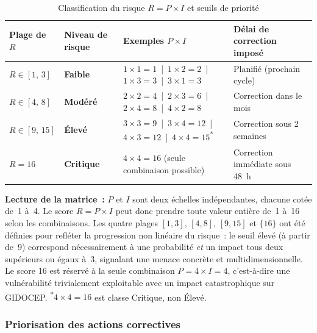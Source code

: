 \documentclass[12pt,a4paper,oneside]{report}
\begin{document}
\begin{table}[H]
	\centering\small
	\caption{Classification du risque $R = P \times I$ et seuils de priorit\'e}
	\label{tab:risque_classification}
	\begin{tabularx}{\textwidth}{p{2.5cm}p{3cm}p{4.5cm}X}
		\toprule
		\rowcolor{theadcolor}
		\color{white}\textbf{Plage de $R$} &
		\color{white}\textbf{Niveau de risque} &
		\color{white}\textbf{Exemples $P \times I$} &
		\color{white}\textbf{D\'elai de correction impos\'e} \\
		\midrule
		$R \in [1,\,3]$ & \textbf{Faible} &
		$1{\times}1{=}1$~|~$1{\times}2{=}2$~|~$1{\times}3{=}3$~|~$3{\times}1{=}3$ &
		Planifi\'e (prochain cycle) \\
		$R \in [4,\,8]$ & \textbf{Mod\'er\'e} &
		$2{\times}2{=}4$~|~$2{\times}3{=}6$~|~$2{\times}4{=}8$~|~$4{\times}2{=}8$ &
		Correction dans le mois \\
		$R \in [9,\,15]$ & \textbf{\'Elev\'e} &
		$3{\times}3{=}9$~|~$3{\times}4{=}12$~|~$4{\times}3{=}12$~|~$4{\times}4{=}15$\textsuperscript{*} &
		Correction sous 2 semaines \\
		$R = 16$ & \textbf{Critique} &
		$4{\times}4{=}16$ (seule combinaison possible) &
		Correction imm\'ediate sous 48~h \\
		\bottomrule
	\end{tabularx}
\end{table}

\begin{encadre}
	\textbf{Lecture de la matrice~:} $P$ et $I$ sont deux \'echelles
	ind\'ependantes, chacune cot\'ee de~1 \`a~4. Le score $R = P \times I$
	peut donc prendre toute valeur enti\`ere de~1 \`a~16 selon les combinaisons.
	Les quatre plages $[1,3]$, $[4,8]$, $[9,15]$ et $\{16\}$ ont \'et\'e
	d\'efinies pour refl\'eter la progression non lin\'eaire du risque~: le
	seuil \'elev\'e (\`a partir de~9) correspond n\'ecessairement \`a une
	probabilit\'e \textit{et} un impact tous deux sup\'erieurs ou \'egaux
	\`a~3, signalant une menace concr\`ete et multidimensionnelle. Le score
	16 est r\'eserv\'e \`a la seule combinaison $P=4 \times I=4$,
	c'est-\`a-dire une vuln\'erabilit\'e trivialement exploitable avec un
	impact catastrophique sur GIDOCEP. \textsuperscript{*}$4 \times 4 = 16$
	est classe Critique, non \'Elev\'e.
\end{encadre}

\subsubsection{Priorisation des actions correctives}
\end{document}
